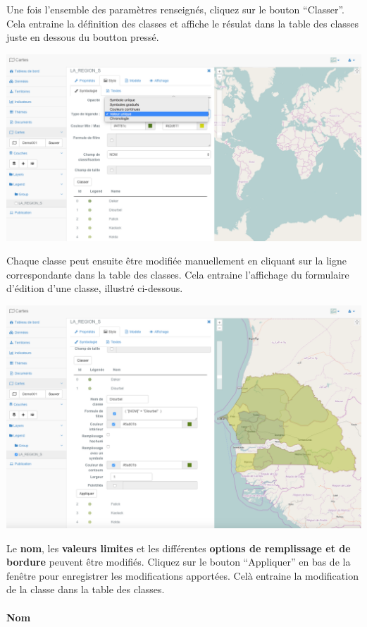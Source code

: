 \documentclass[letterpaper,10pt,french]{sphinxmanual}
\begin{document}
Une fois l'ensemble des paramètres renseignés, cliquez sur le bouton
``Classer''. Cela entraine la définition des classes et affiche le
résulat dans la table des classes juste en dessous du boutton pressé.

\includegraphics[width=1.000\linewidth]{layer-classes-table.png}

Chaque classe peut ensuite être modifiée manuellement en cliquant sur
la ligne correspondante dans la table des classes. Cela entraine
l'affichage du formulaire d'édition d'une classe, illustré ci-dessous.

\includegraphics[width=1.000\linewidth]{edit-indicator-class.png}

Le \textbf{nom}, les \textbf{valeurs limites} et les différentes \textbf{options de remplissage et de bordure} peuvent être modifiés. Cliquez sur le bouton ``Appliquer'' en bas de la fenêtre pour enregistrer les modifications apportées. Celà entraine la modification de la classe dans la table des classes.
\paragraph{Nom}
\end{document}
